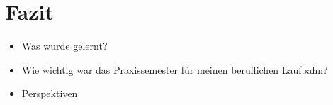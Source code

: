 \section{Fazit}

\begin{itemize}
    \item Was wurde gelernt?
    \item Wie wichtig war das Praxissemester für meinen beruflichen Laufbahn?
    \item Perspektiven
\end{itemize}
